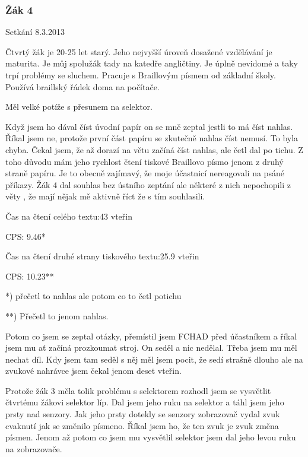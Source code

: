 \subsubsection{Žák 4}

Setkání 8.3.2013

Čtvrtý žák je 20-25 let starý.  Jeho nejvyšší úroveň dosažené vzdělávání je maturita.  Je můj spolužák tady na katedře angličtiny. Je úplně nevidomé a taky trpí problémy se sluchem.  Pracuje s Braillovým písmem od základní školy. Používá braillský řádek doma na počítače.

Měl velké potíže s přesunem na selektor.

Když jsem ho dával číst úvodní papír on se mně zeptal jestli to má číst nahlas.  Říkal jsem ne, protože první část papíru se zkutečně nahlas číst nemusí.  To byla chyba.  Čekal jsem, že až dorazí na větu  začíná číst nahlas, ale četl dal po tichu.  Z toho důvodu mám jeho rychlost čtení tiskové Braillovo písmo jenom z druhý straně papíru.  Je to obecně zajímavý, že moje účastnicí nereagovali na psáné příkazy.  Žák 4 dal souhlas bez ústního zeptání ale některé z nich nepochopili z věty , že mají nějak mě aktivně říct že s tím souhlasili.

Čas na čtení celého textu:43 vteřin %

CPS: 9.46*

Čas na čtení druhé strany tiskového textu:25.9 vteřin %

CPS: 10.23**

*) přečetl to nahlas ale potom co to četl potichu

**) Přečetl to jenom nahlas.

Potom co jsem se zeptal otázky, přemístil jsem FCHAD před účastníkem a říkal jsem mu ať začíná prozkoumat stroj.  On seděl a nic nedělal.  Třeba jsem mu měl nechat díl. Kdy jsem tam seděl s něj měl jsem pocit, že sedí strašně dlouho ale na zvukové nahrávce jsem čekal jenom deset vteřin.

Protože žák 3 měla tolik problému s selektorem rozhodl jsem se vysvětlit čtvrtému žákovi selektor líp.  Dal jsem jeho ruku na selektor a táhl jsem jeho prsty nad senzory. Jak jeho prsty dotekly se senzory zobrazovač vydal zvuk cvaknutí jak se změnilo písmeno.  Říkal jsem ho, že ten zvuk je zvuk změna písmen.  Jenom až potom co jsem mu vysvětlil selektor jsem dal jeho levou ruku na zobrazovače.

